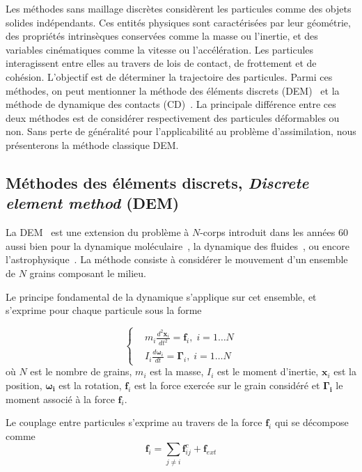 Les méthodes sans maillage discrètes considèrent les particules comme des objets solides indépendants. Ces entités physiques sont caractérisées par leur géométrie, des propriétés intrinsèques conservées comme la masse ou l'inertie, et des variables cinématiques comme la vitesse ou l'accélération. Les particules interagissent entre elles au travers de lois de contact, de frottement et de cohésion. L'objectif est de déterminer la trajectoire des particules. Parmi ces méthodes, on peut mentionner la méthode des éléments discrets (DEM)~\cite{radjai:hal-00691805} et la méthode de dynamique des contacts (CD)~\cite{moreau:hal-01824750}. La principale différence entre ces deux méthodes est de considérer respectivement des particules déformables ou non. Sans perte de généralité pour l'applicabilité au problème d'assimilation, nous présenterons la méthode classique DEM.

\subsection{Méthodes des éléments discrets, \textit{Discrete element method} (DEM)}

La DEM~\cite{cundall_discrete_1979} est une extension du problème à $N$-corps introduit dans les années 60 aussi bien pour la dynamique moléculaire~\cite{Alder1959}, la dynamique des fluides~\cite{Allen1987}, ou encore l'astrophysique~\cite{vonHoerner1960}.
La méthode consiste à considérer le mouvement d'un ensemble de $N$ grains composant le milieu.

Le principe fondamental de la dynamique s'applique sur cet ensemble, et s'exprime pour chaque particule sous la forme

\begin{equation*}
    \left\{
    \begin{aligned}
         & m_{i} \frac{ d^{2}\bm{x}_i }{dt^2}=\bm{f}_{i},\; i=1\ldots N      \\
         & I_{i} \frac{d \bm{\omega}_{i}}{dt}=\bm{\Gamma}_{i},\; i=1\ldots N
    \end{aligned}
    \right.
\end{equation*}où $N$ est le nombre de grains, $m_{i}$ est la masse, $I_i$ est le moment d'inertie, $\bm{x}_{i}$ est la position, $\bm{\omega_{i}}$ est la rotation, $\bm{f}_{i}$ est la force exercée sur le grain considéré et $\bm{\Gamma_{i}}$ le moment associé à la force $\bm{f}_{i}$.

Le couplage entre particules s'exprime au travers de la force $\bm{f}_{i}$ qui se décompose comme
\begin{equation*}
    \bm{f}_{i}=\underset{{\scriptstyle j\neq i}}{\sum}\bm{f}^{c}_{ij}+\bm{f}_{ext}
\end{equation*}

